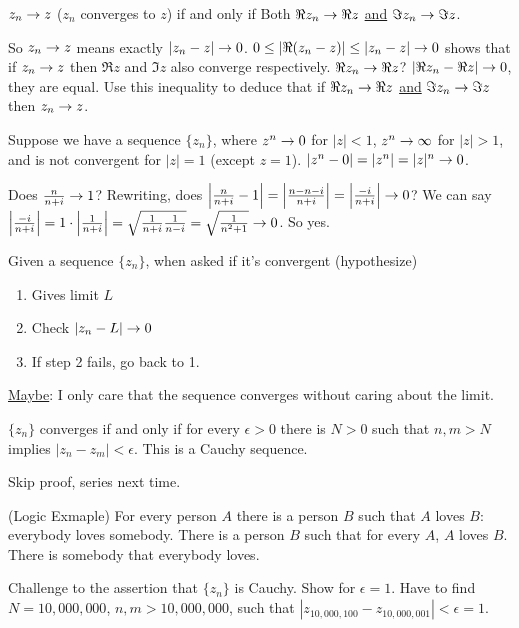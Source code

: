 \documentclass[]{article}
\begin{document}
\begin{proposition}
	$z_n \rightarrow z$ ($z_n$ converges to $z$) if and only if Both $\Re z_n \rightarrow \Re z$ \underline{and} $\Im z_n \rightarrow \Im z$.
\end{proposition}


So $z_n \rightarrow z$ means exactly $|z_n-z|\rightarrow 0$.
$0\leq |\Re(z_n-z)|\leq |z_n-z|\rightarrow 0$ shows that if $z_n\rightarrow z$ then $\Re z$ and $\Im z$ also converge respectively. $\Re z_n \rightarrow \Re z$? $|\Re z_n - \Re z| \rightarrow 0$, they are equal. Use this inequality to deduce that if $\Re z_n \rightarrow \Re z$ \underline{and} $\Im z_n \rightarrow \Im z$ then $z_n \rightarrow z$.

\begin{example}
	Suppose we have a sequence $\{z_n\}$, where $z^n\rightarrow 0$ for $|z|<1$, $z^n\rightarrow \infty$ for $|z|>1$, and is not convergent for $|z|=1$ (except $z=1$). $|z^n-0|=|z^n|=|z|^n\rightarrow0$.
\end{example}
\begin{example}
	Does $\frac{n}{n+i}\rightarrow 1$? Rewriting, does $\left|\frac{n}{n+i}-1\right| = \left|\frac{n-n-i}{n+i}\right|=\left| \frac{-i}{n+i} \right| \rightarrow 0$? We can say $\left|\frac{-i}{n+i}\right| = 1\cdot\left|\frac{1}{n+i}\right|= \sqrt{\frac{1}{n+i}\frac{1}{n-i}} = \sqrt{\frac{1}{n^2+1}}\rightarrow 0$. So yes.
\end{example}
Given a sequence $\{z_n\}$, when asked if it's convergent (hypothesize)
\begin{enumerate}
	\item Gives limit $L$
	\item Check $|z_n-L|\rightarrow 0$
	\item If step 2 fails, go back to 1.
\end{enumerate}
\underline{Maybe}: I only care that the sequence converges without caring about the limit.
\begin{theorem}
	[Proposition 1.4] $\{z_n\}$ converges if and only if for every $ \epsilon>0$ there is $N>0$ such that $n,m>N$ implies $|z_n-z_m|<\epsilon$. This is a Cauchy sequence.
\end{theorem}
Skip proof, series next time.
\begin{example}
	(Logic Exmaple) For every person $A$ there is a person $B$ such that $A$ loves $B$: everybody loves somebody. There is a person $B$ such that for every $A$, $A$ loves $B$. There is somebody that everybody loves.
\end{example}
Challenge to the assertion that $\{z_n\}$ is Cauchy. Show for $\epsilon=1$. Have to find $N=10,000,000$, $n,m>10,000,000$, such that $|z_{10,000,100}-z_{10,000,001}|<\epsilon=1$.
\end{document}
